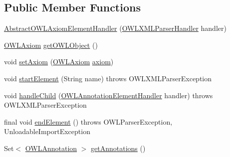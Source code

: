 \subsection*{Public Member Functions}
\begin{DoxyCompactItemize}
\item 
\hyperlink{classorg_1_1coode_1_1owlapi_1_1owlxmlparser_1_1_abstract_o_w_l_axiom_element_handler_ae05b14c4dea6ec84033e26ebc9fe6647}{Abstract\-O\-W\-L\-Axiom\-Element\-Handler} (\hyperlink{classorg_1_1coode_1_1owlapi_1_1owlxmlparser_1_1_o_w_l_x_m_l_parser_handler}{O\-W\-L\-X\-M\-L\-Parser\-Handler} handler)
\item 
\hyperlink{interfaceorg_1_1semanticweb_1_1owlapi_1_1model_1_1_o_w_l_axiom}{O\-W\-L\-Axiom} \hyperlink{classorg_1_1coode_1_1owlapi_1_1owlxmlparser_1_1_abstract_o_w_l_axiom_element_handler_a2a9db0029e13954acb9278eea5d1cedb}{get\-O\-W\-L\-Object} ()
\item 
void \hyperlink{classorg_1_1coode_1_1owlapi_1_1owlxmlparser_1_1_abstract_o_w_l_axiom_element_handler_a34b8ab4471c4ea5f2146c49b5cd3608e}{set\-Axiom} (\hyperlink{interfaceorg_1_1semanticweb_1_1owlapi_1_1model_1_1_o_w_l_axiom}{O\-W\-L\-Axiom} \hyperlink{classorg_1_1coode_1_1owlapi_1_1owlxmlparser_1_1_abstract_o_w_l_axiom_element_handler_a170205bcdb1542a110951507e6047b4a}{axiom})
\item 
void \hyperlink{classorg_1_1coode_1_1owlapi_1_1owlxmlparser_1_1_abstract_o_w_l_axiom_element_handler_ab523218a220e6f15211cc193171a77f8}{start\-Element} (String name)  throws O\-W\-L\-X\-M\-L\-Parser\-Exception 
\item 
void \hyperlink{classorg_1_1coode_1_1owlapi_1_1owlxmlparser_1_1_abstract_o_w_l_axiom_element_handler_a7a849b666b93fd107fabb5d3c59ae549}{handle\-Child} (\hyperlink{classorg_1_1coode_1_1owlapi_1_1owlxmlparser_1_1_o_w_l_annotation_element_handler}{O\-W\-L\-Annotation\-Element\-Handler} handler)  throws O\-W\-L\-X\-M\-L\-Parser\-Exception 
\item 
final void \hyperlink{classorg_1_1coode_1_1owlapi_1_1owlxmlparser_1_1_abstract_o_w_l_axiom_element_handler_adff275ddff191fca184e1ef0439471e3}{end\-Element} ()  throws O\-W\-L\-Parser\-Exception, Unloadable\-Import\-Exception 
\item 
Set$<$ \hyperlink{interfaceorg_1_1semanticweb_1_1owlapi_1_1model_1_1_o_w_l_annotation}{O\-W\-L\-Annotation} $>$ \hyperlink{classorg_1_1coode_1_1owlapi_1_1owlxmlparser_1_1_abstract_o_w_l_axiom_element_handler_adda2eda76e250c0ba94526d0372c606c}{get\-Annotations} ()
\end{DoxyCompactItemize}
